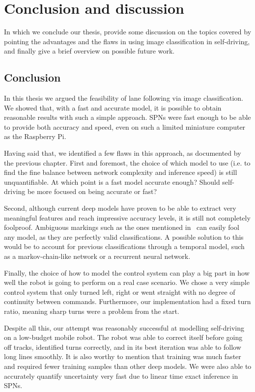
\chapter{Conclusion and discussion}\label{chp:conclusions}

In which we conclude our thesis, provide some discussion on the topics covered by pointing the
advantages and the flaws in using image classification in self-driving, and finally give a brief
overview on possible future work.

\section{Conclusion}

In this thesis we argued the feasibility of lane following via image classification. We showed
that, with a fast and accurate model, it is possible to obtain reasonable results with such a
simple approach. SPNs were fast enough to be able to provide both accuracy and speed, even on such
a limited miniature computer as the Raspberry Pi.

Having said that, we identified a few flaws in this approach, as documented by the previous
chapter.  First and foremost, the choice of which model to use (i.e. to find the fine balance
between network complexity and inference speed) is still unquantifiable. At which point is a fast
model accurate enough? Should self-driving be more focused on being accurate or fast?

Second, although current deep models have proven to be able to extract very meaningful features and
reach impressive accuracy levels, it is still not completely foolproof. Ambiguous markings such as
the ones mentioned in~ can easily fool any model, as they are perfectly
valid classifications. A possible solution to this would be to account for previous classifications
through a temporal model, such as a markov-chain-like network or a recurrent neural network.

Finally, the choice of how to model the control system can play a big part in how well the robot is
going to perform on a real case scenario. We chose a very simple control system that only turned
left, right or went straight with no degree of continuity between commands. Furthermore, our
implementation had a fixed turn ratio, meaning sharp turns were a problem from the start.

Despite all this, our attempt was reasonably successful at modelling self-driving on a low-budget
mobile robot. The robot was able to correct itself before going off tracks, identified turns
correctly, and in its best iteration was able to follow long lines smoothly. It is also worthy to
mention that training was much faster and required fewer training samples than other deep models.
We were also able to accurately quantify uncertainty very fast due to linear time exact inference
in SPNs.

